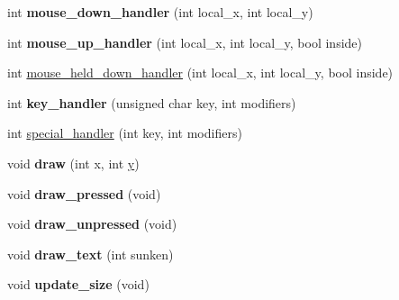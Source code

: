 \begin{DoxyCompactItemize}
\item 
\hypertarget{class_g_l_u_i___scrollbar_a8a964670e5d2366454321ffc2875d3c5}{int {\bfseries mouse\+\_\+down\+\_\+handler} (int local\+\_\+x, int local\+\_\+y)}\label{class_g_l_u_i___scrollbar_a8a964670e5d2366454321ffc2875d3c5}

\item 
\hypertarget{class_g_l_u_i___scrollbar_a89178e785dc2238966c5865b58f3f502}{int {\bfseries mouse\+\_\+up\+\_\+handler} (int local\+\_\+x, int local\+\_\+y, bool inside)}\label{class_g_l_u_i___scrollbar_a89178e785dc2238966c5865b58f3f502}

\item 
int \hyperlink{class_g_l_u_i___scrollbar_a7ab8e938ca0cbd466bf1951afc4397f8}{mouse\+\_\+held\+\_\+down\+\_\+handler} (int local\+\_\+x, int local\+\_\+y, bool inside)
\item 
\hypertarget{class_g_l_u_i___scrollbar_acb4a0198d2b6550d4c78a389e1972098}{int {\bfseries key\+\_\+handler} (unsigned char key, int modifiers)}\label{class_g_l_u_i___scrollbar_acb4a0198d2b6550d4c78a389e1972098}

\item 
int \hyperlink{class_g_l_u_i___scrollbar_a88f94cf8ce76c4976d7ac8ae0b739925}{special\+\_\+handler} (int key, int modifiers)
\item 
\hypertarget{class_g_l_u_i___scrollbar_afa2e4b7a10b10bb593ed71b14345217f}{void {\bfseries draw} (int x, int \hyperlink{_ice_utils_8h_aa7ffaed69623192258fb8679569ff9ba}{y})}\label{class_g_l_u_i___scrollbar_afa2e4b7a10b10bb593ed71b14345217f}

\item 
\hypertarget{class_g_l_u_i___scrollbar_a1589afa827b869eaf57e974c92021a77}{void {\bfseries draw\+\_\+pressed} (void)}\label{class_g_l_u_i___scrollbar_a1589afa827b869eaf57e974c92021a77}

\item 
\hypertarget{class_g_l_u_i___scrollbar_a3f93fe95f02722fbd6117854eeaa23f5}{void {\bfseries draw\+\_\+unpressed} (void)}\label{class_g_l_u_i___scrollbar_a3f93fe95f02722fbd6117854eeaa23f5}

\item 
\hypertarget{class_g_l_u_i___scrollbar_acefbec38ea1cb5725217fe88382ffc8f}{void {\bfseries draw\+\_\+text} (int sunken)}\label{class_g_l_u_i___scrollbar_acefbec38ea1cb5725217fe88382ffc8f}

\item 
\hypertarget{class_g_l_u_i___scrollbar_a93ddd03928b9dca260263ee135c0f3a6}{void {\bfseries update\+\_\+size} (void)}\label{class_g_l_u_i___scrollbar_a93ddd03928b9dca260263ee135c0f3a6}


\end{DoxyCompactItemize}
